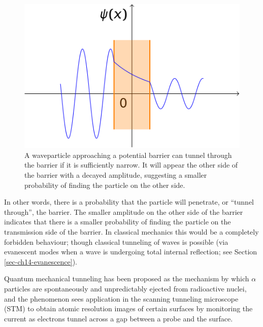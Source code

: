 \documentclass[
]{book}
\begin{document}
\begin{figure}

{\centering \includegraphics[width=0.7\linewidth]{visualisations/LaTeX/ch18-pestep4} 

}

\caption{A waveparticle approaching a potential barrier can tunnel through the barrier if it is sufficiently narrow. It will appear the other side of the barrier with a decayed amplitude, suggesting a smaller probability of finding the particle on the other side.}\label{fig:ch18-tunelling2}
\end{figure}

In other words, there is a probability that the particle will penetrate, or ``tunnel through'', the barrier. The smaller amplitude on the other side of the barrier indicates that there is a smaller probability of finding the particle on the transmission side of the barrier. In classical mechanics this would be a completely forbidden behaviour; though classical tunneling of waves is possible (via evanescent modes when a wave is undergoing total internal reflection; see Section \ref{sec-ch14-evanescence}).

Quantum mechanical tunneling has been proposed as the mechanism by which \(\alpha\) particles are spontaneously and unpredictably ejected from radioactive nuclei, and the phenomenon sees application in the scanning tunneling microscope (STM) to obtain atomic resolution images of certain surfaces by monitoring the current as electrons tunnel across a gap between a probe and the surface.

  
\end{document}
